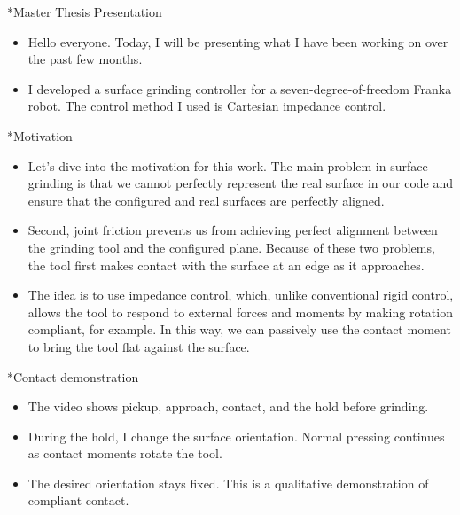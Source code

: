 \documentclass[12pt,a4paper]{article}
\makeatletter
\renewcommand\section{\@startsection{section}{1}{0pt}{14pt}{6pt}{\normalfont\Large\bfseries\color{navy}}}
\makeatother
\begin{document}
\section*{Master Thesis Presentation}
\begin{itemize}
\item Hello everyone. Today, I will be presenting what I have been working on over the past few months.
\item I developed a surface grinding controller for a seven-degree-of-freedom Franka robot. The control method I used is Cartesian impedance control.
\end{itemize}

\section*{Motivation}
\begin{itemize}
\item Let's dive into the motivation for this work. The main problem in surface grinding is that we cannot perfectly represent the real surface in our code and ensure that the configured and real surfaces are perfectly aligned.
\item Second, joint friction prevents us from achieving perfect alignment between the grinding tool and the configured plane. Because of these two problems, the tool first makes contact with the surface at an edge as it approaches.
\item The idea is to use impedance control, which, unlike conventional rigid control, allows the tool to respond to external forces and moments by making rotation compliant, for example. In this way, we can passively use the contact moment to bring the tool flat against the surface.
\end{itemize}

\section*{Contact demonstration}
\begin{itemize}
\item The video shows pickup, approach, contact, and the hold before grinding.
\item During the hold, I change the surface orientation. Normal pressing continues as contact moments rotate the tool.
\item The desired orientation stays fixed. This is a qualitative demonstration of compliant contact.
\end{itemize}
\end{document}
